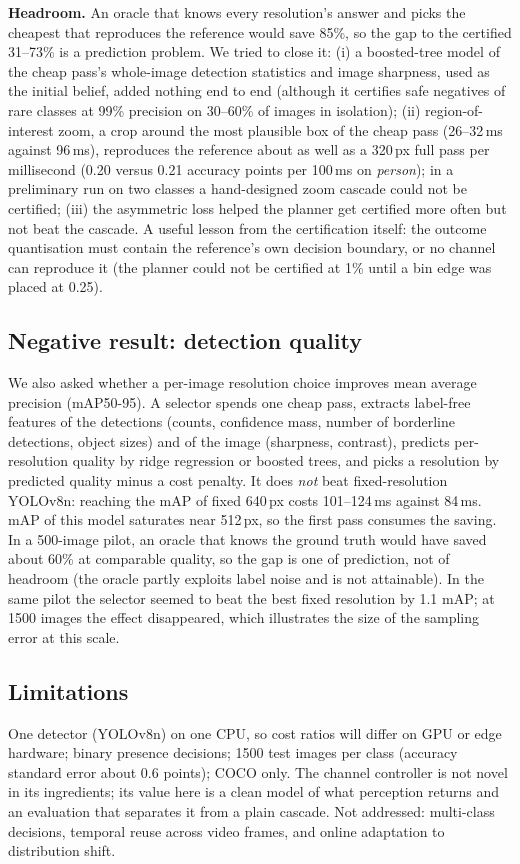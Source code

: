 \documentclass[11pt]{article}
\begin{document}
\textbf{Headroom.} An oracle that knows every resolution's answer and picks the cheapest that reproduces the
reference would save 85\%, so the gap to the certified 31--73\% is a prediction problem. We tried to close it:
(i) a boosted-tree model of the cheap pass's whole-image detection statistics and image sharpness, used as the
initial belief, added nothing end to end (although it certifies safe negatives of rare classes at 99\% precision on
30--60\% of images in isolation); (ii) region-of-interest zoom, a crop around the most plausible box of the cheap
pass (26--32\,ms against 96\,ms), reproduces the reference about as well as a 320\,px full pass per millisecond
(0.20 versus 0.21 accuracy points per 100\,ms on \emph{person}); in a preliminary run on two classes a hand-designed zoom cascade could not be certified;
(iii) the asymmetric loss helped the planner get certified more often but not beat the cascade. A useful lesson from
the certification itself: the outcome quantisation must contain the reference's own decision boundary, or no channel can reproduce
it (the planner could not be certified at 1\% until a bin edge was placed at 0.25).

\subsection{Negative result: detection quality}
We also asked whether a per-image resolution choice improves mean average precision (mAP50-95).
A selector spends one cheap pass, extracts label-free features of the detections (counts, confidence
mass, number of borderline detections, object sizes) and of the image (sharpness, contrast), predicts
per-resolution quality by ridge regression or boosted trees, and picks a resolution by predicted
quality minus a cost penalty. It does \emph{not} beat fixed-resolution YOLOv8n: reaching the mAP of
fixed 640\,px costs 101--124\,ms against 84\,ms. mAP of this model saturates near 512\,px, so the
first pass consumes the saving. In a 500-image pilot, an oracle that knows the ground truth would have saved about 60\%
at comparable quality, so the gap is one of prediction, not of headroom (the oracle
partly exploits label noise and is not attainable). In the same pilot the selector
seemed to beat the best fixed resolution by 1.1 mAP; at 1500 images the effect disappeared, which illustrates the size of the
sampling error at this scale.

\subsection{Limitations}
One detector (YOLOv8n) on one CPU, so cost ratios will differ on GPU or edge hardware; binary
presence decisions; 1500 test images per class (accuracy standard error about 0.6 points); COCO
only. The channel controller is not novel in its ingredients; its value here is a clean model of what
perception returns and an evaluation that separates it from a plain cascade. Not addressed:
multi-class decisions, temporal reuse across video frames, and online adaptation to distribution
shift.
\end{document}
